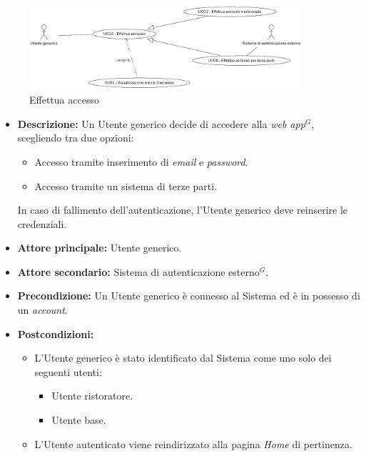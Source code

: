 \newpage
{}
\label{usecase:Effettua accesso}

\begin{figure}[h]
	\centering
	\includegraphics[width=0.9\textwidth]{./uml/UCG6-7-8.png} 
	\caption{Effettua accesso}
	\label{fig:UCG6-7-8}
  \end{figure}

\begin{itemize}
	\item \textbf{Descrizione:} Un Utente generico decide di accedere alla \textit{web app$^G$}, scegliendo tra due opzioni:
	\begin{itemize}
		\item Accesso tramite inserimento di \textit{email} e \textit{password}.
		\item Accesso tramite un sistema di terze parti.
	\end{itemize}
	In caso di fallimento dell'autenticazione, l'Utente generico deve reinserire le credenziali.

	\item \textbf{Attore principale:} Utente generico.
	\item \textbf{Attore secondario:} Sistema di autenticazione esterno$^G$.
	\item \textbf{Precondizione:}
	      Un Utente generico è connesso al Sistema ed è in possesso di un \textit{account}.

	\item \textbf{Postcondizioni:}
		\begin{itemize}      
			\item L'Utente generico è stato identificato dal Sistema come uno solo dei seguenti utenti:
	      		\begin{itemize}
		      		\item Utente ristoratore.
		      		\item Utente base.
	      		\end{itemize}
		  	\item L'Utente autenticato viene reindirizzato alla pagina \textit{Home} di pertinenza.
		\end{itemize}


\end{itemize}
